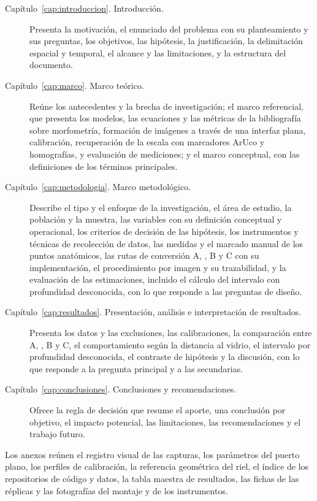 \begin{description}
  \item[Capítulo~\ref{cap:introduccion}. Introducción.] Presenta la motivación, el enunciado del problema con su planteamiento y sus preguntas, los objetivos, las hipótesis, la justificación, la delimitación espacial y temporal, el alcance y las limitaciones, y la estructura del documento.
  \item[Capítulo~\ref{cap:marco}. Marco teórico.] Reúne los antecedentes y la brecha de investigación; el marco referencial, que presenta los modelos, las ecuaciones y las métricas de la bibliografía sobre morfometría, formación de imágenes a través de una interfaz plana, calibración, recuperación de la escala con marcadores ArUco y homografías, y evaluación de mediciones; y el marco conceptual, con las definiciones de los términos principales.
  \item[Capítulo~\ref{cap:metodologia}. Marco metodológico.] Describe el tipo y el enfoque de la investigación, el área de estudio, la población y la muestra, las variables con su definición conceptual y operacional, los criterios de decisión de las hipótesis, los instrumentos y técnicas de recolección de datos, las medidas y el marcado manual de los puntos anatómicos, las rutas de conversión A, \Aprime, B y C con su implementación, el procedimiento por imagen y su trazabilidad, y la evaluación de las estimaciones, incluido el cálculo del intervalo con profundidad desconocida, con lo que responde a las preguntas de diseño.
  \item[Capítulo~\ref{cap:resultados}. Presentación, análisis e interpretación de resultados.] Presenta los datos y las exclusiones, las calibraciones, la comparación entre A, \Aprime, B y C, el comportamiento según la distancia al vidrio, el intervalo por profundidad desconocida, el contraste de hipótesis y la discusión, con lo que responde a la pregunta principal y a las secundarias.
  \item[Capítulo~\ref{cap:conclusiones}. Conclusiones y recomendaciones.] Ofrece la regla de decisión que resume el aporte, una conclusión por objetivo, el impacto potencial, las limitaciones, las recomendaciones y el trabajo futuro.
\end{description}

Los anexos reúnen el registro visual de las capturas, los parámetros del puerto plano, los perfiles de calibración, la referencia geométrica del riel, el índice de los repositorios de código y datos, la tabla maestra de resultados, las fichas de las réplicas y las fotografías del montaje y de los instrumentos.
